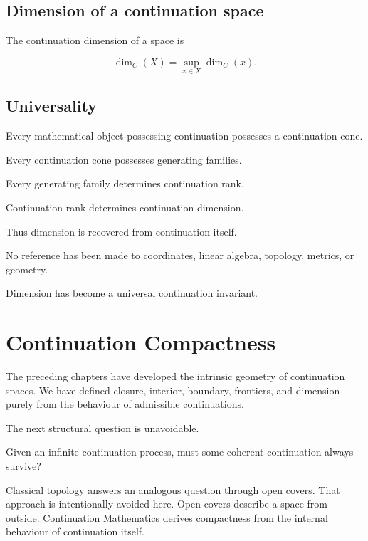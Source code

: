 \documentclass[13pt,openany]{book}
\theoremstyle{plain}
\theoremstyle{definition}
\begin{document}

\section{Dimension of a continuation space}

The continuation dimension of a space is

\[
\dim_C(X)
=
\sup_{x\in X}
\dim_C(x).
\]


\section{Universality}

Every mathematical object possessing continuation possesses a continuation
cone.

Every continuation cone possesses generating families.

Every generating family determines continuation rank.

Continuation rank determines continuation dimension.

Thus dimension is recovered from continuation itself.

No reference has been made to coordinates,
linear algebra,
topology,
metrics,
or geometry.

Dimension has become a universal continuation invariant.


\chapter{Continuation Compactness}

The preceding chapters have developed the intrinsic geometry of continuation
spaces. We have defined closure, interior, boundary, frontiers, and dimension
purely from the behaviour of admissible continuations.

The next structural question is unavoidable.

Given an infinite continuation process, must some coherent continuation always
survive?

Classical topology answers an analogous question through open covers. That
approach is intentionally avoided here. Open covers describe a space from
outside. Continuation Mathematics derives compactness from the internal
behaviour of continuation itself.
\end{document}
